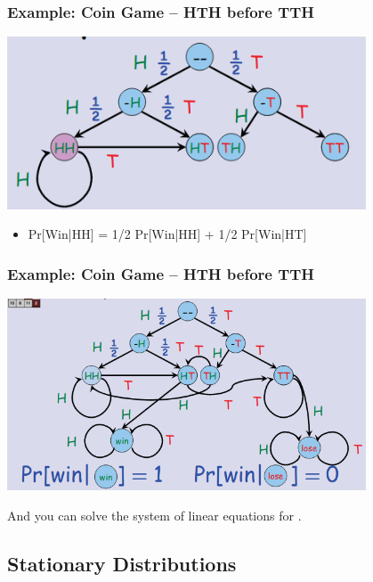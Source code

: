 \documentclass{beamer}
\begin{document}
\begin{frame}
  \frametitle{Example: Coin Game -- HTH before TTH}
  \begin{center}
    \includegraphics[width=0.8\textwidth]{../img/hth_4}
  \end{center}

  {\larger
    \begin{itemize}
    \item Pr[Win|HH] = 1/2 Pr[Win|HH] + 1/2 Pr[Win|HT]
    \end{itemize}
  }
\end{frame}

\begin{frame}
  \frametitle{Example: Coin Game -- HTH before TTH}
  \begin{center}
    \includegraphics[width=0.8\textwidth]{../img/hth_5}
  \end{center}

  {\larger

    \bigskip

    And you can solve the system of linear equations for .
  }
\end{frame}

\subsection{Stationary Distributions}
\end{document}
